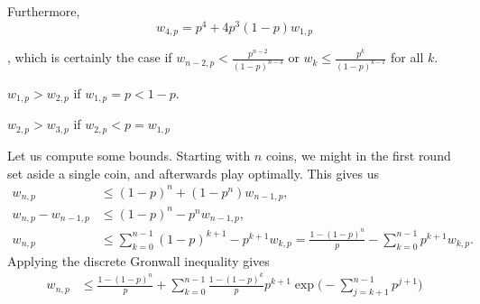 \documentclass{article}
\theoremstyle{definition}
\theoremstyle{step} \newtheorem{step}{Step}
\begin{document}
Furthermore,
$$ w_{4,p} = p^4 + 4p^3(1-p) w_{1,p} $$


,
which is certainly the case if $w_{n-2,p} <
\frac{p^{n-2}}{(1-p)^{n-3}}$ or $w_k \leq \frac{p^k}{(1-p)^{k-1}}$ for
all $k$.

$w_{1,p} > w_{2,p}$ if $w_{1,p} = p < 1-p$.

$w_{2,p} > w_{3,p}$ if $w_{2,p} < p = w_{1,p}$

\newpage


Let us compute some bounds. Starting with $n$ coins, we might in the
first round set aside a single coin, and afterwards play
optimally. This gives us
\begin{align*}
  w_{n,p} & \leq (1-p)^n + (1 - p^n)w_{n-1,p},\\ w_{n,p} - w_{n-1,p} &
  \leq (1-p)^n - p^n w_{n-1,p},\\ w_{n,p} & \leq
  \sum_{k=0}^{n-1}(1-p)^{k+1} - p^{k+1} w_{k,p} = \frac{1 -
    (1-p)^n}{p} - \sum_{k=0}^{n-1} p^{k+1} w_{k,p}.
\end{align*}
Applying the discrete Gronwall inequality gives
\begin{align*}
w_{n,p} & \leq \frac{1 - (1-p)^n}{p} + \sum_{k=0}^{n-1}\frac{1 -
  (1-p)^k}{p} p^{k+1} \exp\Big( - \sum_{j=k+1}^{n-1} p^{j+1} \Big)
\end{align*}
\end{document}
